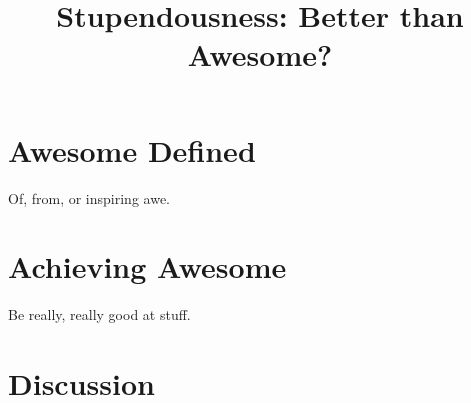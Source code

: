 \documentclass{article}
\begin{document}
\title{Stupendousness: Better than Awesome?}

\section{Awesome Defined}

Of, from, or inspiring awe.

\section{Achieving Awesome}

Be really, really good at stuff.

\section{Discussion}
\end{document}
